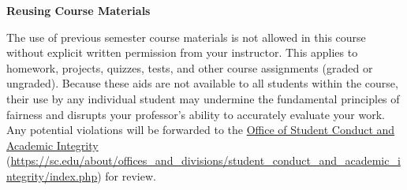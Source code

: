 \documentclass[11pt,letterpaper]{article}
\begin{document}
{\bfseries Reusing Course Materials} \par
The use of previous semester course materials is not allowed in this course without explicit written permission from your instructor. This applies to homework, projects, quizzes, tests, and other course assignments (graded or ungraded). Because these aids are not available to all students within the course, their use by any individual student may undermine the fundamental principles of fairness and disrupts your professor's ability to accurately evaluate your work. Any potential violations will be forwarded to the \href{https://sc.edu/about/offices\_and\_divisions/student\_conduct\_and\_academic\_integrity/index.php}{Office of Student Conduct and Academic Integrity} (\url{https://sc.edu/about/offices\_and\_divisions/student\_conduct\_and\_academic\_integrity/index.php}) for review. \sectionbreak



 \pvspace{0.1cm}
\end{document}

